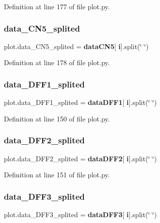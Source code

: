 Definition at line 177 of file plot.\+py.

\mbox{\label{namespaceplot_a60bb0c8c28391783b0894f481cfe78aa}} 
\subsubsection{data\+\_\+\+C\+N5\+\_\+splited}
{\footnotesize\ttfamily plot.\+data\+\_\+\+C\+N5\+\_\+splited = \textbf{ data\+C\+N5}[\textbf{ i}].split(\char`\"{} \char`\"{})}



Definition at line 178 of file plot.\+py.

\mbox{\label{namespaceplot_a8412590f756dc0beefcf1b3af73336b0}} 
\subsubsection{data\+\_\+\+D\+F\+F1\+\_\+splited}
{\footnotesize\ttfamily plot.\+data\+\_\+\+D\+F\+F1\+\_\+splited = \textbf{ data\+D\+F\+F1}[\textbf{ i}].split(\char`\"{} \char`\"{})}



Definition at line 150 of file plot.\+py.

\mbox{\label{namespaceplot_a78ad9382408e17dfdf89d24a3a4623c9}} 
\subsubsection{data\+\_\+\+D\+F\+F2\+\_\+splited}
{\footnotesize\ttfamily plot.\+data\+\_\+\+D\+F\+F2\+\_\+splited = \textbf{ data\+D\+F\+F2}[\textbf{ i}].split(\char`\"{} \char`\"{})}



Definition at line 151 of file plot.\+py.

\mbox{\label{namespaceplot_a2b51f248bac03ff48b2510b92decd9db}} 
\subsubsection{data\+\_\+\+D\+F\+F3\+\_\+splited}
{\footnotesize\ttfamily plot.\+data\+\_\+\+D\+F\+F3\+\_\+splited = \textbf{ data\+D\+F\+F3}[\textbf{ i}].split(\char`\"{} \char`\"{})}



